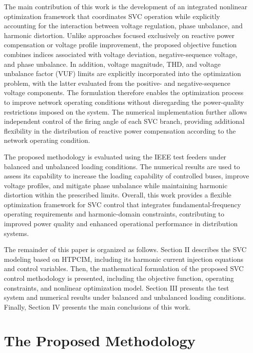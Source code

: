 \documentclass[journal]{IEEEtran}
\begin{document}
The main contribution of this work is the development of an integrated nonlinear optimization framework that coordinates SVC operation while explicitly accounting for the interaction between voltage regulation, phase unbalance, and harmonic distortion. Unlike approaches focused exclusively on reactive power compensation or voltage profile improvement, the proposed objective function combines indices associated with voltage deviation, negative-sequence voltage, and phase unbalance. In addition, voltage magnitude, THD, and voltage unbalance factor (VUF) limits are explicitly incorporated into the optimization problem, with the latter evaluated from the positive- and negative-sequence voltage components. The formulation therefore enables the optimization process to improve network operating conditions without disregarding the power-quality restrictions imposed on the system. The numerical implementation further allows independent control of the firing angle of each SVC branch, providing additional flexibility in the distribution of reactive power compensation according to the network operating condition.

The proposed methodology is evaluated using the IEEE test feeders under balanced and unbalanced loading conditions. The numerical results are used to assess its capability to increase the loading capability of controlled buses, improve voltage profiles, and mitigate phase unbalance while maintaining harmonic distortion within the prescribed limits. Overall, this work provides a flexible optimization framework for SVC control that integrates fundamental-frequency operating requirements and harmonic-domain constraints, contributing to improved power quality and enhanced operational performance in distribution systems.



The remainder of this paper is organized as follows. Section II describes the SVC modeling based on HTPCIM, including its harmonic current injection equations and control variables. Then, the mathematical formulation of the proposed SVC control methodology is presented, including the objective function, operating constraints, and nonlinear optimization model. Section III presents the test system and numerical results under balanced and unbalanced loading conditions. Finally, Section IV presents the main conclusions of this work.

\section{The Proposed Methodology}
\label{sec:methodology}
\end{document}
